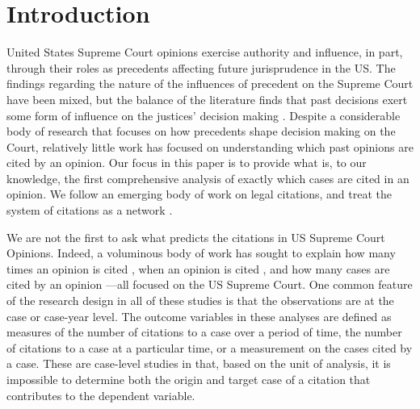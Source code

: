 \documentclass[headsepline=true, abstracton]{scrartcl}
\begin{document}
\onehalfspacing
\section{Introduction}
\label{sec:overview}

United States Supreme Court opinions exercise authority and influence, in part, through their roles as precedents affecting future jurisprudence in the US. The findings regarding the nature of the influences of precedent on the Supreme Court have been mixed, but the balance of the literature finds that past decisions exert some form of influence on the justices' decision making \citep{knight1996norm,gillman2001s,richards2002jurisprudential,hansford2006politics,bailey2008does,bailey2011constrained,pang2012endogenous}. Despite a considerable body of research that focuses on how precedents shape decision making on the Court, relatively little work has focused on understanding which past opinions are cited by an opinion. Our focus in this paper is to provide what is, to our knowledge, the first comprehensive analysis of exactly which cases are cited in an opinion. We follow an emerging body of work on legal citations, and treat the system of citations as a network \citep[e.g., ][]{caldeira1988legal,fowler2007network, fowler2008authority,bommarito2009law,lupu2012precedent,pelc2014politics,ethayarajh2018rose}. 

We are not the first to ask what predicts the citations in US Supreme Court Opinions. Indeed, a voluminous body of work has sought to explain how many times an opinion is cited \citep[e.g.,][]{cross2010determinants,benjamin2012standing,fix2019effect}, when an opinion is cited \citep[e.g.,][]{black2013citation,spriggs2001explaining}, and how many cases are cited by an opinion \citep[e.g.,][]{lupu2013strategic}---all focused on the US Supreme Court. One common feature of the research design in all of these studies is that the observations are at the case or case-year level. The outcome variables in these analyses are defined as measures of the number of citations to a case over a period of time, the number of citations to a case at a particular time, or a measurement on the cases cited by a case. These are case-level studies in that, based on the unit of analysis, it is impossible to determine both the origin and target case of a citation that contributes to the dependent variable.
\end{document}
